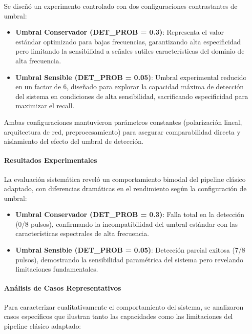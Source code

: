 Se diseñó un experimento controlado con dos configuraciones contrastantes de umbral:

\begin{itemize}
    \item \textbf{Umbral Conservador (DET\_PROB = 0.3)}: Representa el valor estándar optimizado para bajas frecuencias, garantizando alta especificidad pero limitando la sensibilidad a señales sutiles características del dominio de alta frecuencia.
    \item \textbf{Umbral Sensible (DET\_PROB = 0.05)}: Umbral experimental reducido en un factor de 6, diseñado para explorar la capacidad máxima de detección del sistema en condiciones de alta sensibilidad, sacrificando especificidad para maximizar el recall.
\end{itemize}

Ambas configuraciones mantuvieron parámetros constantes (polarización lineal, arquitectura de red, preprocesamiento) para asegurar comparabilidad directa y aislamiento del efecto del umbral de detección.

\paragraph{Resultados Experimentales}

La evaluación sistemática reveló un comportamiento bimodal del pipeline clásico adaptado, con diferencias dramáticas en el rendimiento según la configuración de umbral:

\begin{itemize}
    \item \textbf{Umbral Conservador (DET\_PROB = 0.3)}: Falla total en la detección (0/8 pulsos), confirmando la incompatibilidad del umbral estándar con las características espectrales de alta frecuencia.
    \item \textbf{Umbral Sensible (DET\_PROB = 0.05)}: Detección parcial exitosa (7/8 pulsos), demostrando la sensibilidad paramétrica del sistema pero revelando limitaciones fundamentales.
\end{itemize}

\paragraph{Análisis de Casos Representativos}

Para caracterizar cualitativamente el comportamiento del sistema, se analizaron casos específicos que ilustran tanto las capacidades como las limitaciones del pipeline clásico adaptado:

